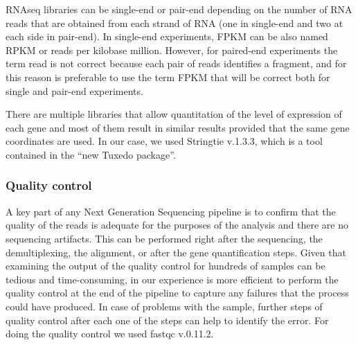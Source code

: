 RNAseq libraries can be single-end or pair-end depending on the number of RNA reads that are obtained from each strand of RNA (one in single-end and two at each side in pair-end). In single-end experiments, FPKM can be also named RPKM or reads per kilobase million. However, for paired-end experiments the term read is not correct because each pair of reads identifies a fragment, and for this reason is preferable to use the term FPKM that will be correct both for single and pair-end experiments.

There are multiple libraries that allow quantitation of the level of expression of each gene and most of them result in similar results provided that the same gene coordinates are used. In our case, we used Stringtie v.1.3.3, which is a tool contained in the “new Tuxedo package”.

\subsubsection{Quality control}
A key part of any Next Generation Sequencing pipeline is to confirm that the quality of the reads is adequate for the purposes of the analysis and there are no sequencing artifacts. This can be performed right after the sequencing, the demultiplexing, the alignment, or after the gene quantification steps. Given that examining the output of the quality control for hundreds of samples can be tedious and time-consuming, in our experience is more efficient to perform the quality control at the end of the pipeline to capture any failures that the process could have produced. In case of problems with the sample, further steps of quality control after each one of the steps can help to identify the error. For doing the quality control we used fastqc v.0.11.2.

